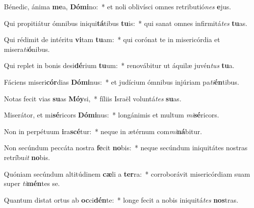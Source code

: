 \item Bénedic, ánima \textbf{me}a, \textbf{Dó}\textbf{mi}no:~* et noli oblivísci omnes retributió\textit{nes} \textbf{e}jus.
\item Qui propitiátur ómnibus iniqui\textbf{tá}tibus \textbf{tu}is:~* qui sanat omnes infirmitá\textit{tes} \textbf{tu}as.
\item Qui rédimit de intéritu \textbf{vi}tam \textbf{tu}am:~* qui corónat te in misericórdia et misera\textit{ti}\textbf{ó}nibus.
\item Qui replet in bonis desi\textbf{dé}rium \textbf{tu}um:~* renovábitur ut áquilæ juvén\textit{tus} \textbf{tu}a.
\item Fáciens miseri\textbf{cór}dias \textbf{Dó}\textbf{mi}nus:~* et judícium ómnibus injúriam pa\textit{ti}\textbf{én}tibus.
\item Notas fecit vias \textbf{su}as \textbf{Mó}\textbf{y}si,~* fíliis Israël voluntá\textit{tes} \textbf{su}as.
\item Miserátor, et mi\textbf{sé}ricors \textbf{Dó}\textbf{mi}nus:~* longánimis et multum \textit{mi}\textbf{sé}ricors.
\item Non in perpétuum \textbf{i}ra\textbf{scé}tur:~* neque in ætérnum com\textit{mi}\textbf{ná}bitur.
\item Non secúndum peccáta nostra \textbf{fe}cit \textbf{no}bis:~* neque secúndum iniquitátes nostras retríbu\textit{it} \textbf{no}bis.
\item Quóniam secúndum altitúdinem \textbf{cæ}li a \textbf{ter}ra:~* corroborávit misericórdiam suam super \textit{ti}\textbf{mén}tes se.
\item Quantum distat ortus ab \textbf{oc}ci\textbf{dén}te:~* longe fecit a nobis iniquitá\textit{tes} \textbf{nos}tras.
